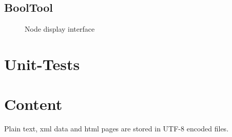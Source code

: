 \subsection{BoolTool}




\begin{figure}[htbp]
\begin{center}
\caption{Node display interface}
\label{fig:NyayaNodeDisplay}
\end{center}
\end{figure}









\section{Unit-Tests}

\section{Content}

Plain text, xml data and html pages are stored in UTF-8 encoded files. 



